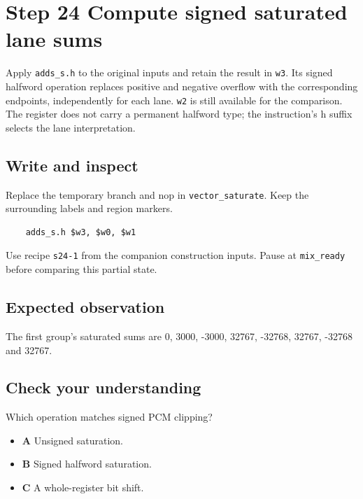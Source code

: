 \section{Step 24 Compute signed saturated lane sums}\label{pcm-s24}

Apply \texttt{adds\_s.h} to the original inputs and retain the result in \texttt{w3}. Its signed halfword operation replaces positive and negative overflow with the corresponding endpoints, independently for each lane. \texttt{w2} is still available for the comparison. The register does not carry a permanent halfword type; the instruction’s h suffix selects the lane interpretation.

\subsection{Write and inspect}
Replace the temporary branch and nop in \texttt{vector\_saturate}. Keep the surrounding labels and region markers.

\begin{verbatim}
    adds_s.h $w3, $w0, $w1
\end{verbatim}
Use recipe \texttt{s24-1} from the companion construction inputs. Pause at \texttt{mix\_ready} before comparing this partial state.

\subsection{Expected observation}
The first group’s saturated sums are 0, 3000, -3000, 32767, -32768, 32767, -32768 and 32767.

\subsection{Check your understanding}
Which operation matches signed PCM clipping?

\begin{itemize}
  \item \textbf{A} Unsigned saturation.
  \item \textbf{B} Signed halfword saturation.
  \item \textbf{C} A whole-register bit shift.
\end{itemize}
